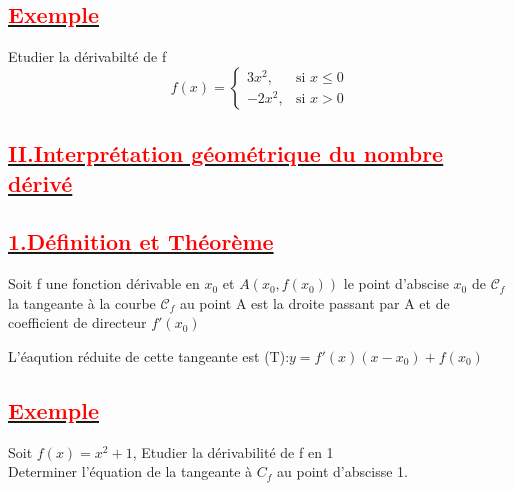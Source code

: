 \documentclass[12pt]{article}
\begin{document}
\subsection*{\underline{\textbf{\textcolor{red}{Exemple}}}}
Etudier la dérivabilté de f\\
\[ f(x) = \begin{cases} 
  3x^{2}, & \text{si } x \leq 0 \\
  -2x^{2}, & \text{si } x > 0 
\end{cases} \]
\subsection*{\underline{\textbf{\textcolor{red}{II.Interprétation géométrique du nombre dérivé}}}}
\subsection*{\underline{\textbf{\textcolor{red}{1.Définition et Théorème}}}}
Soit f une fonction dérivable en $x_{0}$ et $A(x_{0},f(x_{0}))$ le point d'abscise $x_{0}$ de $\mathcal{C}_{f}$ la tangeante à la courbe $\mathcal{C}_{f}$ au point A est la droite passant par A et de coefficient de directeur $f'(x_{0})$\\
L'éaqution réduite de cette tangeante est (T):$y=f'(x)(x-x_{0})+f(x_{0})$
\subsection*{\underline{\textbf{\textcolor{red}{Exemple}}}}
Soit $f(x)=x^{2}+1$, Etudier la dérivabilité de f en 1\\
Determiner l'équation de la tangeante à $C_{f}$ au point d'abscisse 1.\\
\end{document}
